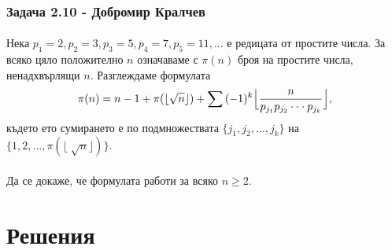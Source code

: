 \documentclass[12pt]{article}
\begin{document}
\subsubsection*{Задача 2.10 - Добромир Кралчев}
\paragraph*{}
Нека $p_1 = 2, p_2 = 3, p_3 = 5, p_4 = 7, p_5 = 11, ...$ е редицата от простите числа. За всяко цяло положително $n$ означаваме с $\pi(n)$ броя на простите числа, ненадхвърлящи $n$. Разглеждаме формулата
\begin{equation*}
    \pi(n) = n - 1 + \pi(\lfloor \sqrt{n} \rfloor) + \sum {(-1)^k \Bigl\lfloor \frac{n}{p_{j_1} p_{j_2} \cdot \cdot \cdot p_{j_k}} \Bigr\rfloor},
\end{equation*}
където ето сумирането е по подмножествата $\{ j_1, j_2, ..., j_k \}$ на $\{ 1, 2, ..., \pi(\lfloor \sqrt[]{n} \rfloor) \}$.
\paragraph*{}
Да се докаже, че формулата работи за всяко $n \geq 2$.


\section*{Решения}
\end{document}
